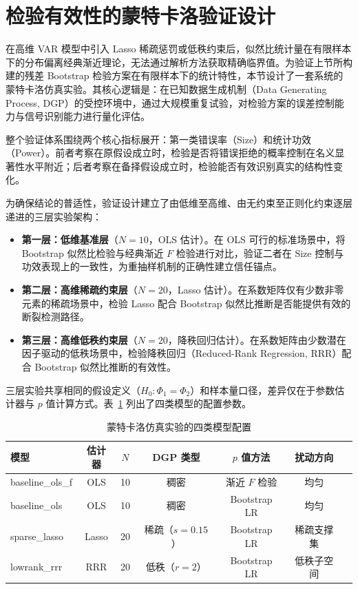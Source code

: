 
\section{检验有效性的蒙特卡洛验证设计}\label{sec:mc-design}

在高维 VAR 模型中引入 Lasso 稀疏惩罚或低秩约束后，似然比统计量在有限样本下的分布偏离经典渐近理论，无法通过解析方法获取精确临界值。为验证上节所构建的残差 Bootstrap 检验方案在有限样本下的统计特性，本节设计了一套系统的蒙特卡洛仿真实验。其核心逻辑是：在已知数据生成机制（Data Generating Process, DGP）的受控环境中，通过大规模重复试验，对检验方案的误差控制能力与信号识别能力进行量化评估。

整个验证体系围绕两个核心指标展开：第一类错误率（Size）和统计功效（Power）。前者考察在原假设成立时，检验是否将错误拒绝的概率控制在名义显著性水平附近；后者考察在备择假设成立时，检验能否有效识别真实的结构性变化。

为确保结论的普适性，验证设计建立了由低维至高维、由无约束至正则化约束逐层递进的三层实验架构：
\begin{itemize}
    \item \textbf{第一层：低维基准层}（$N=10$，OLS 估计）。在 OLS 可行的标准场景中，将 Bootstrap 似然比检验与经典渐近 $F$ 检验进行对比，验证二者在 Size 控制与功效表现上的一致性，为重抽样机制的正确性建立信任锚点。
    \item \textbf{第二层：高维稀疏约束层}（$N=20$，Lasso 估计）。在系数矩阵仅有少数非零元素的稀疏场景中，检验 Lasso 配合 Bootstrap 似然比推断是否能提供有效的断裂检测路径。
    \item \textbf{第三层：高维低秩约束层}（$N=20$，降秩回归估计）。在系数矩阵由少数潜在因子驱动的低秩场景中，检验降秩回归（Reduced-Rank Regression, RRR）配合 Bootstrap 似然比推断的有效性。
\end{itemize}

三层实验共享相同的假设定义（$H_0: \Phi_1 = \Phi_2$）和样本量口径，差异仅在于参数估计器与 $p$ 值计算方式。表~\ref{tab:mc-models} 列出了四类模型的配置参数。

\begin{table}[htbp]
\centering
\caption{蒙特卡洛仿真实验的四类模型配置}\label{tab:mc-models}
\begin{tabular}{lcccccc}
\toprule
模型 & 估计器 & $N$ & DGP 类型 & $p$ 值方法 & 扰动方向 \\
\midrule
baseline\_ols\_f & OLS & 10 & 稠密 & 渐近 $F$ 检验 & 均匀 \\
baseline\_ols    & OLS & 10 & 稠密 & Bootstrap LR & 均匀 \\
sparse\_lasso    & Lasso & 20 & 稀疏（$s=0.15$） & Bootstrap LR & 稀疏支撑集 \\
lowrank\_rrr     & RRR & 20 & 低秩（$r=2$） & Bootstrap LR & 低秩子空间 \\
\bottomrule
\end{tabular}
\end{table}

